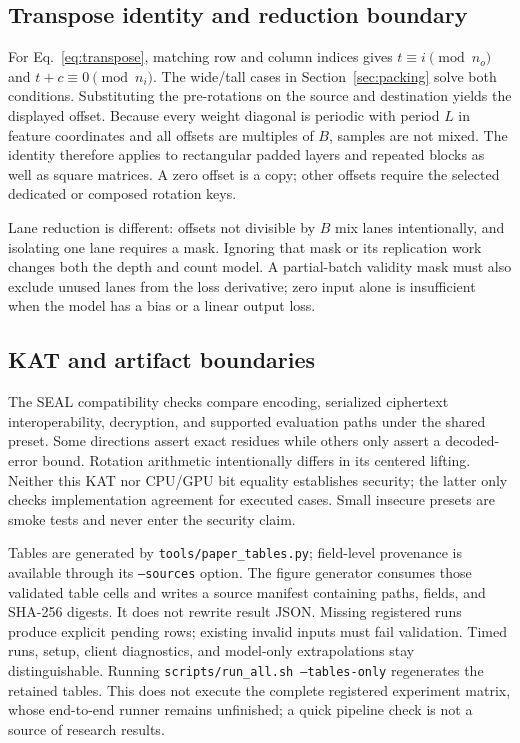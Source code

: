 \subsection{Transpose identity and reduction boundary}
For Eq.~\eqref{eq:transpose}, matching row and column indices gives $t\equiv i\pmod {n_o}$ and $t+c\equiv0\pmod {n_i}$. The wide/tall cases in Section~\ref{sec:packing} solve both conditions. Substituting the pre-rotations on the source and destination yields the displayed offset. Because every weight diagonal is periodic with period $L$ in feature coordinates and all offsets are multiples of $B$, samples are not mixed. The identity therefore applies to rectangular padded layers and repeated blocks as well as square matrices. A zero offset is a copy; other offsets require the selected dedicated or composed rotation keys.

Lane reduction is different: offsets not divisible by $B$ mix lanes intentionally, and isolating one lane requires a mask. Ignoring that mask or its replication work changes both the depth and count model. A partial-batch validity mask must also exclude unused lanes from the loss derivative; zero input alone is insufficient when the model has a bias or a linear output loss.

\subsection{KAT and artifact boundaries}
The SEAL compatibility checks compare encoding, serialized ciphertext interoperability, decryption, and supported evaluation paths under the shared preset. Some directions assert exact residues while others only assert a decoded-error bound. Rotation arithmetic intentionally differs in its centered lifting. Neither this KAT nor CPU/GPU bit equality establishes security; the latter only checks implementation agreement for executed cases. Small insecure presets are smoke tests and never enter the security claim.

Tables are generated by \texttt{tools/paper\_tables.py}; field-level provenance is available through its \texttt{--sources} option. The figure generator consumes those validated table cells and writes a source manifest containing paths, fields, and SHA-256 digests. It does not rewrite result JSON. Missing registered runs produce explicit pending rows; existing invalid inputs must fail validation. Timed runs, setup, client diagnostics, and model-only extrapolations stay distinguishable. Running \texttt{scripts/run\_all.sh --tables-only} regenerates the retained tables. This does not execute the complete registered experiment matrix, whose end-to-end runner remains unfinished; a quick pipeline check is not a source of research results.

